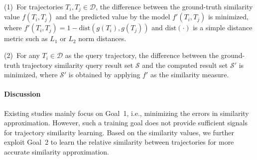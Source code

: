 (1)~For trajectories $T_i, T_j \in \mathcal{D}$, the difference between the ground-truth similarity value $f(T_i, T_j)$ and the predicted value by the model $f'(T_i, T_j)$ is minimized, where $f'(T_i, T_j) = 1- \text{dist}(g(T_i), g(T_j))$ and
$\text{dist}(\cdot)$ is a simple distance metric such as $L_1$ or $L_2$ norm distances.

(2)~For any $T_i \in \mathcal{D}$ as the query trajectory, the difference between the ground-truth trajectory similarity query result set $\mathcal{S}$ and the computed result set $\mathcal{S}'$ is minimized, 
where $\mathcal{S}'$ is obtained by applying $f'$ as the similarity measure.

\paragraph{Discussion}
Existing studies mainly focus on Goal~1, i.e., minimizing the errors in similarity approximation. 
However, such a training goal does not provide sufficient signals for trajectory similarity learning. Based on the similarity values, we further exploit Goal~2 to learn the relative similarity between trajectories for more accurate similarity approximation.

